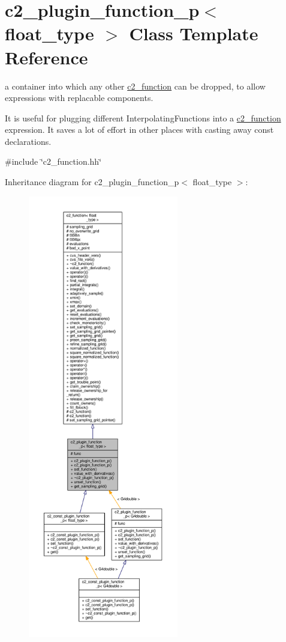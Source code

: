 \hypertarget{classc2__plugin__function__p}{}\section{c2\+\_\+plugin\+\_\+function\+\_\+p$<$ float\+\_\+type $>$ Class Template Reference}
\label{classc2__plugin__function__p}


a container into which any other \hyperlink{classc2__function}{c2\+\_\+function} can be dropped, to allow expressions with replacable components.

It is useful for plugging different Interpolating\+Functions into a \hyperlink{classc2__function}{c2\+\_\+function} expression. It saves a lot of effort in other places with casting away const declarations.  




{\ttfamily \#include \char`\"{}c2\+\_\+function.\+hh\char`\"{}}



Inheritance diagram for c2\+\_\+plugin\+\_\+function\+\_\+p$<$ float\+\_\+type $>$\+:
\nopagebreak
\begin{figure}[H]
\begin{center}
\leavevmode
\includegraphics[height=550pt]{classc2__plugin__function__p__inherit__graph}
\end{center}
\end{figure}


